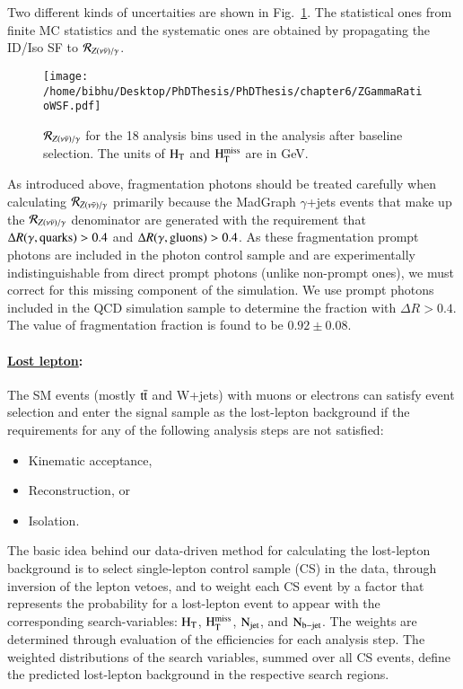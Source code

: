 Two different kinds of uncertaities are shown in Fig.~\ref{fig:rzg}. The statistical ones from finite MC statistics and the systematic ones are obtained by propagating the ID/Iso SF to  ${\cal R}_{Z(\nu\bar{\nu})/\gamma}$.
  
\begin{figure}[h]
\begin{center}
  \texttt{[image: /home/bibhu/Desktop/PhDThesis/PhDThesis/chapter6/ZGammaRatioWSF.pdf]} %
  \caption{${\cal R}_{Z(\nu\bar{\nu})/\gamma}$ for the 18 analysis bins used in the analysis after baseline selection. The units of $\rm H_{T}$ and $\rm H_{T}^{miss}$  are in GeV.}
  \label{fig:rzg}
\end{center}
\end{figure}

As introduced above, fragmentation photons should be treated carefully when calculating 
${\cal R}_{Z(\nu\bar{\nu})/\gamma}$ primarily because the {\sc MadGraph} $\gamma$+jets events 
that make up the ${\cal R}_{Z(\nu\bar{\nu})/\gamma}$ denominator are generated with the 
requirement that $\Delta R(\gamma,{\rm quarks})>0.4$ and $\Delta R(\gamma,{\rm gluons})>0.4$.
As these fragmentation prompt photons are included in the photon control sample 
and are experimentally indistinguishable from direct prompt photons (unlike non-prompt 
 ones), we must correct for this missing component of the simulation.  We use prompt 
photons included in the QCD simulation sample to determine the fraction with $\Delta R>0.4$. The value of fragmentation fraction is found to be $0.92 \pm 0.08$.








\paragraph{\underline{Lost lepton}: }
The SM events (mostly $\rm t\bar{t}$ and W+jets) with muons or electrons
can satisfy event selection and enter the signal sample as the lost-lepton background
if the requirements for any of the following analysis steps are not satisfied:

\begin{itemize}
\item Kinematic acceptance,
\item Reconstruction, or
\item Isolation.
\end{itemize}
The basic idea behind our data-driven method for calculating
the lost-lepton background is to select
single-lepton control sample (CS) in the data,
through inversion of the lepton vetoes,
and to weight each CS event
by a factor that represents the probability for a lost-lepton event
to appear with
the corresponding search-variables: $\rm H_{T}$, $\rm H_{T}^{miss}$, $\rm N_{jet}$, and $\rm N_{b-jet}$.
The weights are determined through evaluation of the efficiencies
for each analysis step.
The weighted distributions of the search variables,
summed over all CS events,
define the predicted lost-lepton background in the respective search regions.
